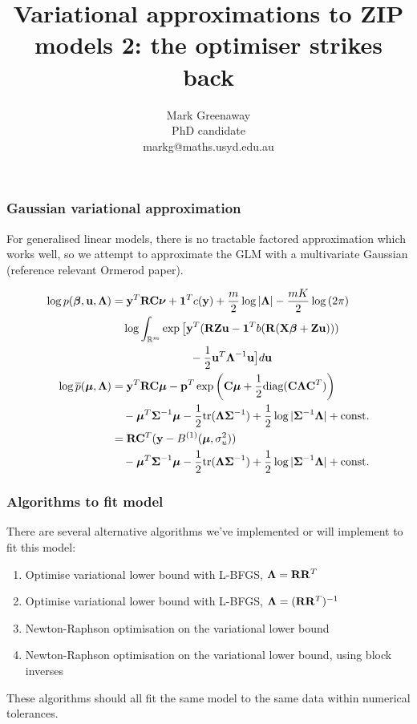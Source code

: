 \documentclass{beamer}
\title{Variational approximations to ZIP models 2: the optimiser strikes back}
\author{Mark Greenaway\\PhD candidate\\markg@maths.usyd.edu.au}
\begin{document}
\begin{frame}
\titlepage
\end{frame}

\begin{frame}
\frametitle{Gaussian variational approximation}
For generalised linear models, there is no tractable factored 
approximation which works well, so we attempt to approximate
the GLM with a multivariate Gaussian (reference relevant
Ormerod paper).
\end{frame}

\begin{frame}
\begin{align*}
\log p({\boldsymbol \beta}, {\bf u}, {\boldsymbol \Lambda}) &= {\bf y}^T {\bf R} {\bf C} {\boldsymbol \nu} + {\bf 1}^T c({\bf y}) + \frac{m}{2} \log |{\boldsymbol \Lambda}| - \frac{mK}{2} \log{(2 \pi)}\\
&\quad \log  \int_{\mathbb{R}^{m}} \exp \big[ {\bf y}^T ({\bf R} {\bf Z} {\bf u} - {\bf 1}^T b({\bf R}( {\bf X} {\boldsymbol \beta} + {\bf Z} {\bf u}))) \\
 &\quad \quad \quad \quad \quad \quad \quad - {\frac{1}{2}} {{\bf u}^T {\boldsymbol \Lambda}^{-1} {\bf u} } \big] d {\bf u} \\
\log \overline{p}({\boldsymbol \mu}, {\boldsymbol \Lambda}) &= {\bf y}^T {\bf R} {\bf C} {\boldsymbol \mu} - {\bf p}^T \exp{\left({\bf C}{\boldsymbol\mu}+ {\frac{1}{2}}\text{diag}{({\bf C}{\boldsymbol\Lambda}{\bf C}^T)}\right)} \\
& \quad - {\boldsymbol \mu}^T {\boldsymbol \Sigma}^{-1} {\boldsymbol \mu} - {\frac{1}{2}} \text{tr}{({\boldsymbol\Lambda}{\boldsymbol\Sigma}^{-1})} + {\frac{1}{2}} \log{|{\boldsymbol\Sigma}^{-1}{\boldsymbol\Lambda}|} + \text{const.} \\
&= {\bf R}{\bf C}^T({\bf y} - B^{(1)}({\boldsymbol \mu}, \sigma^2_u)) \\
& \quad - {\boldsymbol \mu}^T {\boldsymbol \Sigma}^{-1} {\boldsymbol \mu} - {\frac{1}{2}} \text{tr}{({\boldsymbol\Lambda}{\boldsymbol\Sigma}^{-1})} + {\frac{1}{2}} \log{|{\boldsymbol\Sigma}^{-1}{\boldsymbol\Lambda}|} + \text{const.} \\
\end{align*}
\end{frame}

\begin{frame}
\frametitle{Algorithms to fit model}
There are several alternative algorithms we've implemented or will implement
to fit this model:
\begin{enumerate}
\item Optimise variational lower bound with L-BFGS, ${\boldsymbol \Lambda} = {\bf R} {\bf R}^T$
\item Optimise variational lower bound with L-BFGS, ${\boldsymbol \Lambda} = ({\bf R} {\bf R}^T)^{-1}$
\item Newton-Raphson optimisation on the variational lower bound
\item Newton-Raphson optimisation on the variational lower bound, using block inverses
\end{enumerate}

These algorithms should all fit the same model to the same data
within numerical tolerances.
\end{frame}
\end{document}
